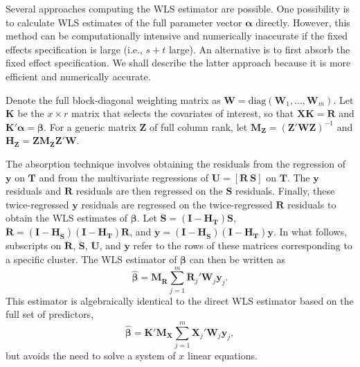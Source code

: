 \documentclass[12pt]{article}\usepackage[]{graphicx}\usepackage[]{color}
\newcommand{\bm}{\mathbf}
\newcommand{\bs}{\boldsymbol}
\begin{document}
Several approaches computing the WLS estimator are possible. 
One possibility is to calculate WLS estimates of the full parameter vector $\bs\alpha$ directly. 
However, this method can be computationally intensive and numerically inaccurate if the fixed effects specification is large (i.e., $s + t$ large). 
An alternative is to first absorb the fixed effect specification. We shall describe the latter approach because it is more efficient and numerically accurate.

Denote the full block-diagonal weighting matrix as $\bm{W} = \text{diag}\left(\bm{W}_1,...,\bm{W}_m\right)$.
Let $\bm{K}$ be the $x \times r$ matrix that selects the covariates of interest, so that $\bm{X} \bm{K} = \bm{R}$ and $\bm{K}'\bs\alpha = \bs\beta$.
For a generic matrix $\bm{Z}$ of full column rank, let $\bm{M_Z} = \left(\bm{Z}'\bm{W}\bm{Z}\right)^{-1}$ and $\bm{H_Z} = \bm{Z}\bm{M_Z}\bm{Z}'\bm{W}$. 

The absorption technique involves obtaining the residuals from the regression of $\bm{y}$ on $\bm{T}$ and from the multivariate regressions of $\bm{U} = [\bm{R}\ \bm{S}]$ on $\bm{T}$. 
The $\bm{y}$ residuals and $\bm{R}$ residuals are then regressed on the $\bm{S}$ residuals. 
Finally, these twice-regressed $\bm{y}$ residuals are regressed on the twice-regressed $\bm{R}$ residuals to obtain the WLS estimates of $\bs\beta$. 
Let $\bm{\ddot{S}} = \left(\bm{I} - \bm{H_T}\right)\bm{S}$, $\bm{\ddot{R}} = \left(\bm{I} - \bm{H_{\ddot{S}}}\right)\left(\bm{I} - \bm{H_T}\right)\bm{R}$, and $\bm{\ddot{y}} = \left(\bm{I} - \bm{H_{\ddot{S}}}\right)\left(\bm{I} - \bm{H_T}\right)\bm{y}$. 
In what follows, subscripts on $\bm{\ddot{R}}$, $\bm{\ddot{S}}$,  $\bm{\ddot{U}}$, and $\bm{\ddot{y}}$ refer to the rows of these matrices corresponding to a specific cluster. 
The WLS estimator of $\bs\beta$ can then be written as
\begin{equation}
\label{eq:WLS}
\bs{\hat\beta} = \bm{M_{\ddot{R}}} \sum_{j=1}^m \bm{\ddot{R}}_j' \bm{W}_j \bm{\ddot{y}}_j. 
\end{equation}
This estimator is algebraically identical to the direct WLS estimator based on the full set of predictors, \[
\bs{\hat\beta} = \bm{K}'\bm{M_X} \sum_{j=1}^m \bm{X}_j' \bm{W}_j \bm{y}_j,
\]
but avoids the need to solve a system of $x$ linear equations.
\end{document}
